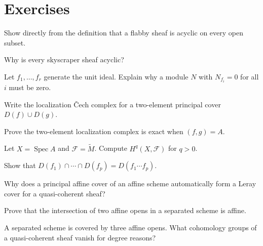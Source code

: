 \section{Exercises}
\begin{exercise}\label{exr:vi49-01}
Show directly from the definition that a flabby sheaf is acyclic on every open subset.
\end{exercise}

\begin{exercise}\label{exr:vi49-02}
Why is every skyscraper sheaf acyclic?
\end{exercise}

\begin{exercise}\label{exr:vi49-03}
Let $f_1,\dots,f_r$ generate the unit ideal. Explain why a module $N$ with $N_{f_i}=0$ for all $i$ must be zero.
\end{exercise}

\begin{exercise}\label{exr:vi49-04}
Write the localization Čech complex for a two-element principal cover $D(f)\cup D(g)$.
\end{exercise}

\begin{exercise}\label{exr:vi49-05}
Prove the two-element localization complex is exact when $(f,g)=A$.
\end{exercise}

\begin{exercise}\label{exr:vi49-06}
Let $X=\operatorname{Spec}A$ and $\mathcal F=\widetilde M$. Compute $H^q(X,\mathcal F)$ for $q>0$.
\end{exercise}

\begin{exercise}\label{exr:vi49-07}
Show that $D(f_1)\cap\cdots\cap D(f_p)=D(f_1\cdots f_p)$.
\end{exercise}

\begin{exercise}\label{exr:vi49-08}
Why does a principal affine cover of an affine scheme automatically form a Leray cover for a quasi-coherent sheaf?
\end{exercise}

\begin{exercise}\label{exr:vi49-09}
Prove that the intersection of two affine opens in a separated scheme is affine.
\end{exercise}

\begin{exercise}\label{exr:vi49-10}
A separated scheme is covered by three affine opens. What cohomology groups of a quasi-coherent sheaf vanish for degree reasons?
\end{exercise}

